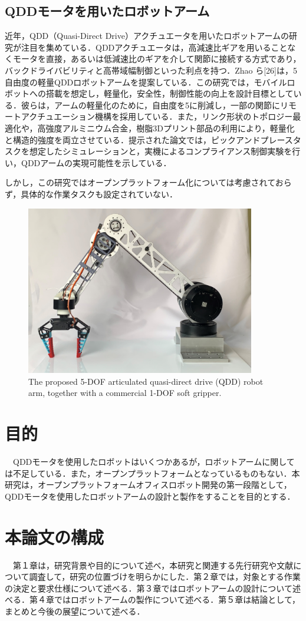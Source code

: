 \subsection{QDDモータを用いたロボットアーム}
近年，QDD（Quasi-Direct Drive）アクチュエータを用いたロボットアームの研究が注目を集めている．QDDアクチュエータは，高減速比ギアを用いることなくモータを直接，あるいは低減速比のギアを介して関節に接続する方式であり，バックドライバビリティと高帯域幅制御といった利点を持つ．Zhao ら[26]は，5自由度の軽量QDDロボットアームを提案している．この研究では，モバイルロボットへの搭載を想定し，軽量化，安全性，制御性能の向上を設計目標としている．彼らは，アームの軽量化のために，自由度を5に削減し，一部の関節にリモートアクチュエーション機構を採用している．また，リンク形状のトポロジー最適化や，高強度アルミニウム合金，樹脂3Dプリント部品の利用により，軽量化と構造的強度を両立させている．提示された論文では，ピックアンドプレースタスクを想定したシミュレーションと，実機によるコンプライアンス制御実験を行い，QDDアームの実現可能性を示している．

しかし，この研究ではオープンプラットフォーム化については考慮されておらず，具体的な作業タスクも設定されていない．
\begin{figure}
  \centering
  \includegraphics[width=10cm]{images/qddarm.png}
  \caption{The proposed 5-DOF articulated quasi-direct drive (QDD) robot arm,
  together with a commercial 1-DOF soft gripper.}
  \label{fig_qddarm}
\end{figure}

\section{目的}
　QDDモータを使用したロボットはいくつかあるが，ロボットアームに関しては不足している．また，オープンプラットフォームとなっているものもない．本研究は，オープンプラットフォームオフィスロボット開発の第一段階として，QDDモータを使用したロボットアームの設計と製作をすることを目的とする．
\section{本論文の構成}
　第１章は，研究背景や目的について述べ，本研究と関連する先行研究や文献について調査して，研究の位置づけを明らかにした．第２章では，対象とする作業の決定と要求仕様について述べる．第３章ではロボットアームの設計について述べる．第４章ではロボットアームの製作について述べる．第５章は結論として，まとめと今後の展望について述べる．

\newpage
